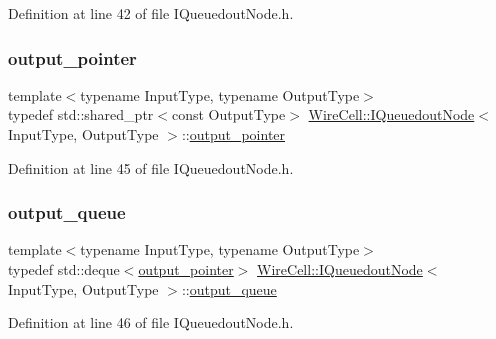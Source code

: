 Definition at line 42 of file I\+Queuedout\+Node.\+h.

\mbox{\label{class_wire_cell_1_1_i_queuedout_node_ae0907b2315773a3aba69764795d9811a}} 
\subsubsection{\texorpdfstring{output\+\_\+pointer}{output\_pointer}}
{\footnotesize\ttfamily template$<$typename Input\+Type, typename Output\+Type$>$ \\
typedef std\+::shared\+\_\+ptr$<$const Output\+Type$>$ \hyperlink{class_wire_cell_1_1_i_queuedout_node}{Wire\+Cell\+::\+I\+Queuedout\+Node}$<$ Input\+Type, Output\+Type $>$\+::\hyperlink{class_wire_cell_1_1_i_queuedout_node_ae0907b2315773a3aba69764795d9811a}{output\+\_\+pointer}}



Definition at line 45 of file I\+Queuedout\+Node.\+h.

\mbox{\label{class_wire_cell_1_1_i_queuedout_node_a39018e4e3dd886befac9636ac791a685}} 
\subsubsection{\texorpdfstring{output\+\_\+queue}{output\_queue}}
{\footnotesize\ttfamily template$<$typename Input\+Type, typename Output\+Type$>$ \\
typedef std\+::deque$<$\hyperlink{class_wire_cell_1_1_i_queuedout_node_ae0907b2315773a3aba69764795d9811a}{output\+\_\+pointer}$>$ \hyperlink{class_wire_cell_1_1_i_queuedout_node}{Wire\+Cell\+::\+I\+Queuedout\+Node}$<$ Input\+Type, Output\+Type $>$\+::\hyperlink{class_wire_cell_1_1_i_queuedout_node_a39018e4e3dd886befac9636ac791a685}{output\+\_\+queue}}



Definition at line 46 of file I\+Queuedout\+Node.\+h.

